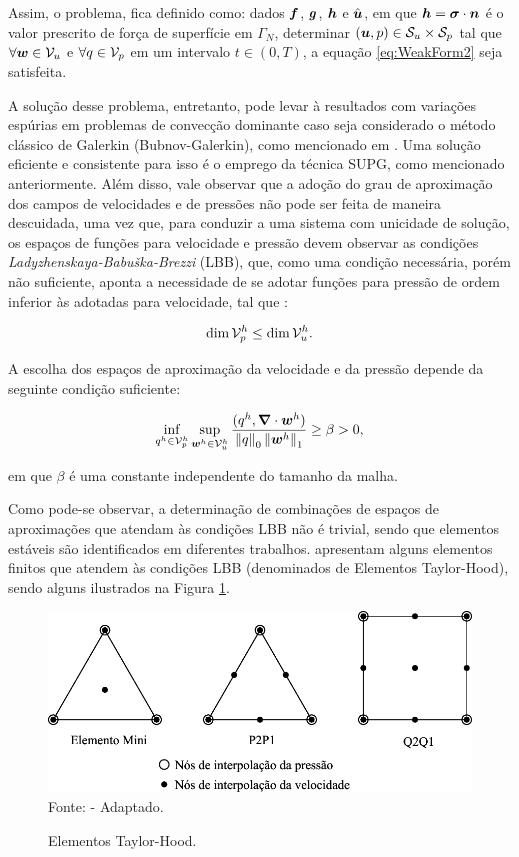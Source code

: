 Assim, o problema, fica definido como: dados $\boldsymbol{f}$, $\boldsymbol{g}$, $\boldsymbol{h}$ e $\hat{\boldsymbol{u}}$, em que $\boldsymbol{h}=\boldsymbol{\sigma}\cdot\boldsymbol{n}$ é o valor prescrito de força de superfície em $\Gamma_N$, determinar $(\boldsymbol{u},p)\in\mathcal{S}_u\times\mathcal{S}_p$ tal que $\forall\boldsymbol{w}\in\mathcal{V}_u$ e $\forall q\in\mathcal{V}_p$ em um intervalo $t\in(0,T)$, a equação \eqref{eq:WeakForm2} seja satisfeita.

A solução desse problema, entretanto, pode levar à resultados com variações espúrias em problemas de convecção dominante caso seja considerado o método clássico de Galerkin (Bubnov-Galerkin), como mencionado em \cite{fernandes2020tecnica,donea2003finite,brooks1982streamline}. Uma solução eficiente e consistente para isso é o emprego da técnica SUPG, como mencionado anteriormente. Além disso, vale observar que a adoção do grau de aproximação dos campos de velocidades e de pressões não pode ser feita de maneira descuidada, uma vez que, para conduzir a uma sistema com unicidade de solução, os espaços de funções para velocidade e pressão devem observar as condições \textit{Ladyzhenskaya-Babuška-Brezzi} (LBB), que, como uma condição necessária, porém não suficiente, aponta a necessidade de se adotar funções para pressão de ordem inferior às adotadas para velocidade, tal que \cite{donea2003finite}:

\begin{equation}
    \dim{\mathcal{V}_p^h}\leq\dim{\mathcal{V}_u^h}\text{.}
\end{equation}

A escolha dos espaços de aproximação da velocidade e da pressão depende da seguinte condição suficiente:

\begin{equation}
    \inf_{q^h\in\mathcal{V}_p^h}{\sup_{\boldsymbol{w}^h\in\mathcal{V}_u^h}{\frac{(q^h,\boldsymbol{\nabla}\cdot\boldsymbol{w}^h)}{\left\lVert{q}\right\lVert_0\left\lVert{\boldsymbol{w}^h}\right\lVert_1}}}\geq\beta>0\text{,}
\end{equation}

\noindent em que $\beta$ é uma constante independente do tamanho da malha.

Como pode-se observar, a determinação de combinações de espaços de aproximações que atendam às condições LBB não é trivial, sendo que elementos estáveis são identificados em diferentes trabalhos.  apresentam alguns elementos finitos que atendem às condições LBB (denominados de Elementos Taylor-Hood), sendo alguns ilustrados na Figura \ref{fig:Taylor-Hood}.

\begin{figure}[h!]
    \centering
    \caption{Elementos Taylor-Hood.}
    \includegraphics[width=.65\linewidth]{Figuras/Taylor-Hood.pdf}
    \\Fonte:  - Adaptado.
    \label{fig:Taylor-Hood}
\end{figure}


